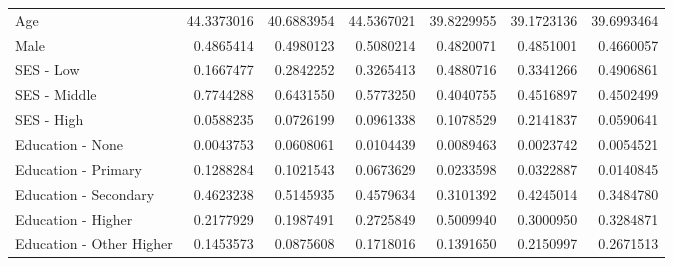 \begin{table}[ht]
\centering
\begin{tabular}{lrrrrrr}
  \hline
  \hline
Age & 44.3373016 & 40.6883954 & 44.5367021 & 39.8229955 & 39.1723136 & 39.6993464 \\ 
  Male & 0.4865414 & 0.4980123 & 0.5080214 & 0.4820071 & 0.4851001 & 0.4660057 \\ 
  SES - Low & 0.1667477 & 0.2842252 & 0.3265413 & 0.4880716 & 0.3341266 & 0.4906861 \\ 
  SES - Middle & 0.7744288 & 0.6431550 & 0.5773250 & 0.4040755 & 0.4516897 & 0.4502499 \\ 
  SES - High & 0.0588235 & 0.0726199 & 0.0961338 & 0.1078529 & 0.2141837 & 0.0590641 \\ 
  Education - None & 0.0043753 & 0.0608061 & 0.0104439 & 0.0089463 & 0.0023742 & 0.0054521 \\ 
  Education - Primary & 0.1288284 & 0.1021543 & 0.0673629 & 0.0233598 & 0.0322887 & 0.0140845 \\ 
  Education - Secondary & 0.4623238 & 0.5145935 & 0.4579634 & 0.3101392 & 0.4245014 & 0.3484780 \\ 
  Education - Higher & 0.2177929 & 0.1987491 & 0.2725849 & 0.5009940 & 0.3000950 & 0.3284871 \\ 
  Education - Other Higher & 0.1453573 & 0.0875608 & 0.1718016 & 0.1391650 & 0.2150997 & 0.2671513 \\ 
   \hline
\end{tabular}
\end{table}
